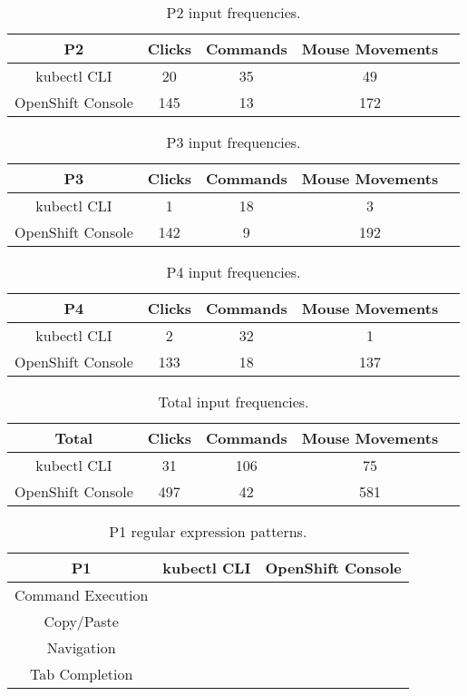 \documentclass[11pt, oneside]{article}   	%
\begin{document}
\begin{table}
 \centering
  \begin{tabular}{ | c | c | c | c | c | } 
  \hline
  P2 & Clicks & Commands & Mouse Movements \\ 
  \hline
  kubectl CLI & 20 & 35 & 49 \\ 
  \hline
  OpenShift Console & 145 & 13 & 172 \\ 
  \hline
  \end{tabular}
 \caption{P2 input frequencies.}
 \label{table:t2}
\end{table}

\begin{table}
 \centering
  \begin{tabular}{ | c | c | c | c | c | } 
  \hline
  P3 & Clicks & Commands & Mouse Movements \\ 
  \hline
  kubectl CLI & 1 & 18 & 3 \\ 
  \hline
  OpenShift Console & 142 & 9 & 192 \\ 
  \hline
  \end{tabular}
 \caption{P3 input frequencies.}
 \label{table:t3}
\end{table}

\begin{table}
 \centering
  \begin{tabular}{ | c | c | c | c | c | } 
  \hline
  P4 & Clicks & Commands & Mouse Movements \\ 
  \hline
  kubectl CLI & 2 & 32 & 1 \\ 
  \hline
  OpenShift Console & 133 & 18 & 137 \\ 
  \hline
  \end{tabular}
 \caption{P4 input frequencies.}
 \label{table:t4}
\end{table}

\begin{table}
 \centering
  \begin{tabular}{ | c | c | c | c | c | } 
  \hline
  Total & Clicks & Commands & Mouse Movements \\ 
  \hline
  kubectl CLI & 31 & 106 & 75 \\ 
  \hline
  OpenShift Console & 497 & 42 & 581 \\ 
  \hline
  \end{tabular}
 \caption{Total input frequencies.}
 \label{table:t5}
\end{table}


\begin{table}
 \centering
  \begin{tabular}{ | c | c | c | } 
  \hline
  P1 & kubectl CLI & OpenShift Console \\ 
  \hline
  Command Execution &  &  \\ 
  \hline
  Copy/Paste & & \\
  \hline
  Navigation & & \\
  \hline
  Tab Completion & & \\
  \hline
  \end{tabular}
 \caption{P1 regular expression patterns.}
\end{table}
\end{document}
